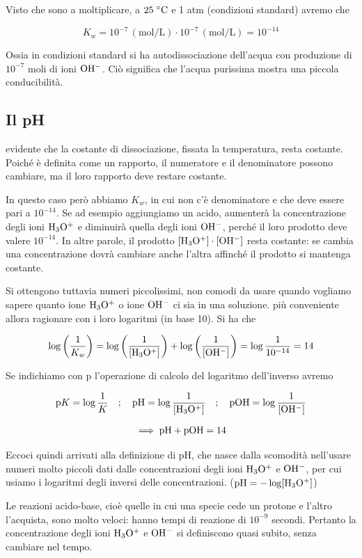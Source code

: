 Visto che sono a moltiplicare, a $25 \; ^{\circ} \rm C$ e 1 atm (condizioni standard) avremo che

$$K_w = 10^{-7} \, (\text{mol/L}) \cdot 10^{-7} \, (\text{mol/L}) = 10^{-14}$$

Ossia in condizioni standard si ha autodissociazione dell'acqua con produzione di $10^{-7}$ moli di ioni $\rm OH^-$. Ciò significa che l'acqua purissima mostra una piccola conducibilità.

\subsection{Il pH}
\E evidente che la costante di dissociazione, fissata la temperatura, resta costante. Poiché è definita come un rapporto, il numeratore e il denominatore possono cambiare, ma il loro rapporto deve restare costante.

In questo caso però abbiamo $K_w$, in cui non c'è denominatore e che deve essere pari a $10^{-14}$. Se ad esempio aggiungiamo un acido, aumenterà la concentrazione degli ioni $\rm H_3O^+$ e diminuirà quella degli ioni $\rm OH^-$, perché il loro prodotto deve valere $10^{-14}$. In altre parole, il prodotto $\rm [H_3O^+] \cdot [OH^-]$ resta costante: se cambia una concentrazione dovrà cambiare anche l'altra affinché il prodotto si mantenga costante.

Si ottengono tuttavia numeri piccolissimi, non comodi da usare quando vogliamo sapere quanto ione $\rm H_3O^+$ o ione $\rm OH^-$ ci sia in una soluzione. \E più conveniente allora ragionare con i loro logaritmi (in base 10). Si ha che

$$\log \left( \frac{1}{K_w} \right) = \log \left( \frac{1}{\rm{[H_3O^+]}} \right) + \log \left( \frac{1}{\rm{[OH^-]}} \right) = \log \frac{1}{10^{-14}}=14$$

Se indichiamo con p l'operazione di calcolo del logaritmo dell'inverso avremo

$$\text{p}K = \log \frac{1}{K}
\quad;\quad
\rm pH = \log \frac{1}{[H_3O^+]}
\quad;\quad
pOH = \log \frac{1}{[OH^-]}$$

$$\implies \rm pH + pOH = 14$$

Eccoci quindi arrivati alla definizione di pH, che nasce dalla scomodità nell'usare numeri molto piccoli dati dalle concentrazioni degli ioni $\rm H_3O^+$ e $\rm OH^-$, per cui usiamo i logaritmi degli inversi delle concentrazioni. ($\rm pH=-\log[H_3O^+]$)

Le reazioni acido-base, cioè quelle in cui una specie cede un protone e l'altro l'acquista, sono molto veloci: hanno tempi di reazione di $10^{-9}$ secondi. Pertanto la concentrazione degli ioni $\rm H_3O^+$ e $\rm OH^-$ si definiscono quasi subito, senza cambiare nel tempo.

